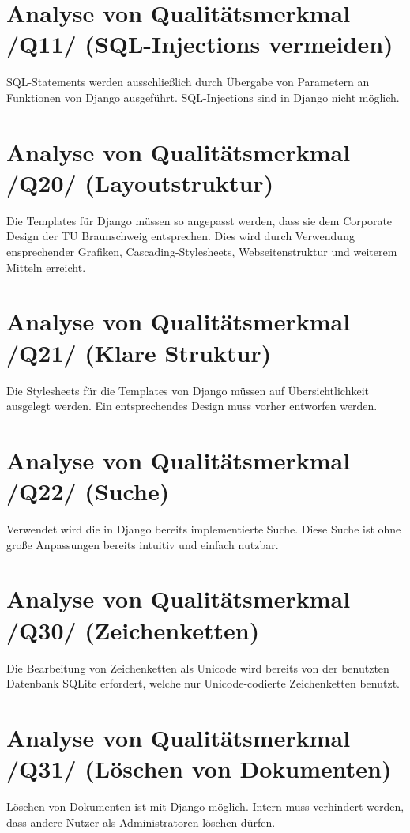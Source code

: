 \section{Analyse von Qualitätsmerkmal /Q11/ (SQL-Injections vermeiden)}

SQL-Statements werden ausschließlich durch Übergabe von Parametern an Funktionen
von Django ausgeführt. SQL-Injections sind in Django nicht möglich.


\section{Analyse von Qualitätsmerkmal /Q20/ (Layoutstruktur)}

Die Templates für Django müssen so angepasst werden, dass sie dem Corporate
Design der TU Braunschweig entsprechen. Dies wird durch Verwendung ensprechender
Grafiken, Cascading-Stylesheets, Webseitenstruktur und weiterem Mitteln erreicht.


\section{Analyse von Qualitätsmerkmal /Q21/ (Klare Struktur)}

Die Stylesheets für die Templates von Django müssen auf Übersichtlichkeit
ausgelegt werden. Ein entsprechendes Design muss vorher entworfen werden.


\section{Analyse von Qualitätsmerkmal /Q22/ (Suche)}


Verwendet wird die in Django bereits implementierte Suche. Diese Suche ist ohne
große Anpassungen bereits intuitiv und einfach nutzbar.


\section{Analyse von Qualitätsmerkmal /Q30/ (Zeichenketten)} 

Die Bearbeitung von Zeichenketten als Unicode wird bereits von der benutzten
Datenbank SQLite erfordert, welche nur Unicode-codierte Zeichenketten benutzt.


\section{Analyse von Qualitätsmerkmal /Q31/ (Löschen von Dokumenten)} 

Löschen von Dokumenten ist mit Django möglich. Intern muss verhindert werden,
dass andere Nutzer als Administratoren löschen dürfen.
